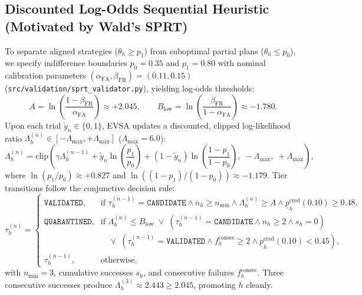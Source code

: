 \documentclass[10pt,letterpaper]{article}
\begin{document}
\subsection{Discounted Log-Odds Sequential Heuristic (Motivated by Wald's SPRT)}
To separate aligned strategies ($\theta_h \ge p_1$) from suboptimal partial plans ($\theta_h \le p_0$), we specify indifference boundaries $p_0 = 0.35$ and $p_1 = 0.80$ with nominal calibration parameters $(\alpha_{\mathrm{FA}}, \beta_{\mathrm{FR}}) = (0.11, 0.15)$ (\texttt{src/validation/sprt\_validator.py}), yielding log-odds thresholds:
\begin{equation}
  A = \ln\!\left(\frac{1 - \beta_{\mathrm{FR}}}{\alpha_{\mathrm{FA}}}\right) \approx +2.045, \qquad
  B_{\mathrm{low}} = \ln\!\left(\frac{\beta_{\mathrm{FR}}}{1 - \alpha_{\mathrm{FA}}}\right) \approx -1.780.
  \label{eq:sprt_bounds}
\end{equation}
Upon each trial $\tilde{y}_n \in \{0,1\}$, EVSA updates a discounted, clipped log-likelihood ratio $\Lambda_h^{(n)} \in [-\Lambda_{\max}, +\Lambda_{\max}]$ ($\Lambda_{\max} = 6.0$):
\begin{equation}
  \Lambda_h^{(n)} = \mathrm{clip}\!\left(\gamma \Lambda_h^{(n-1)} + \tilde{y}_n \ln\!\left(\frac{p_1}{p_0}\right) + (1 - \tilde{y}_n) \ln\!\left(\frac{1 - p_1}{1 - p_0}\right),\; -\Lambda_{\max},\; +\Lambda_{\max}\right),
  \label{eq:sprt_update}
\end{equation}
where $\ln(p_1/p_0) \approx +0.827$ and $\ln((1-p_1)/(1-p_0)) \approx -1.179$. Tier transitions follow the conjunctive decision rule:
\begin{equation}
  \tau_h^{(n)} =
  \begin{cases}
    \texttt{VALIDATED}, & \text{if } \tau_h^{(n-1)} = \texttt{CANDIDATE} \land n_h \ge n_{\min} \land \Lambda_h^{(n)} \ge A \land \underline{p}_h^{\mathrm{cred}}(0.10) \ge 0.48, \\
    \texttt{QUARANTINED}, & \text{if } \Lambda_h^{(n)} \le B_{\mathrm{low}} \;\lor\; (\tau_h^{(n-1)}=\texttt{CANDIDATE} \land n_h \ge 2 \land s_h = 0) \\
                          & \quad \lor\; (\tau_h^{(n-1)}=\texttt{VALIDATED} \land f_h^{\mathrm{consec}} \ge 2 \land \underline{p}_h^{\mathrm{cred}}(0.10) < 0.45), \\
    \tau_h^{(n-1)}, & \text{otherwise},
  \end{cases}
  \label{eq:tier_rules}
\end{equation}
with $n_{\min} = 3$, cumulative successes $s_h$, and consecutive failures $f_h^{\mathrm{consec}}$. Three consecutive successes produce $\Lambda_h^{(3)} \approx 2.443 \ge 2.045$, promoting $h$ cleanly.
\end{document}
